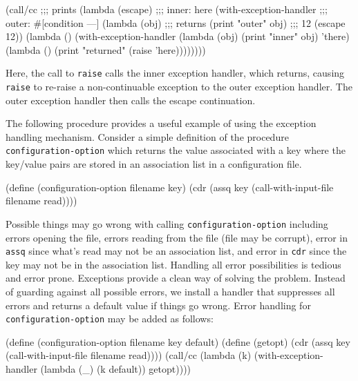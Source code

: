 \documentclass[onecolumn, 12pt, twoside, openright, dvipdfm]{book}
\begin{document}
\begin{CodeInline}
(call/cc                          ;;; prints
  (lambda (escape)                ;;;   inner: here
    (with-exception-handler       ;;;   outer: #[condition ---]
      (lambda (obj)               ;;; returns
        (print "outer" obj)       ;;;   12
        (escape 12))
      (lambda ()                            
        (with-exception-handler            
          (lambda (obj)
            (print "inner" obj)
            'there)
          (lambda ()
            (print "returned" (raise 'here))))))))
\end{CodeInline}

Here, the call to \texttt{raise} calls the inner exception handler,
which returns, causing \texttt{raise} to re-raise a non-continuable 
exception to the outer exception handler.  The outer exception
handler then calls the escape continuation.

The following procedure provides a useful example of using the
exception handling mechanism.  Consider a simple definition of the
procedure \texttt{configuration-option} which returns the value
associated with a key where the key/value pairs are stored in an
association list in a configuration file.

\begin{CodeInline}
(define (configuration-option filename key)
  (cdr (assq key (call-with-input-file filename read))))
\end{CodeInline}

Possible things may go wrong with calling
\texttt{configuration-option} including errors opening the file,
errors reading from the file (file may be corrupt), error in
\texttt{assq} since what's read may not be an association list, and
error in \texttt{cdr} since the key may not be in the association
list.  Handling all error possibilities is tedious and error prone.  
Exceptions provide a clean way of solving the problem.  Instead of
guarding against all possible errors, we install a handler that
suppresses all errors and returns a default value if things go
wrong.  Error handling for \texttt{configuration-option} may be
added as follows:

\begin{CodeInline}
(define (configuration-option filename key default)
  (define (getopt)
    (cdr (assq key (call-with-input-file filename read))))
  (call/cc
    (lambda (k)
      (with-exception-handler 
        (lambda (_) (k default))
        getopt))))
\end{CodeInline}
\end{document}
